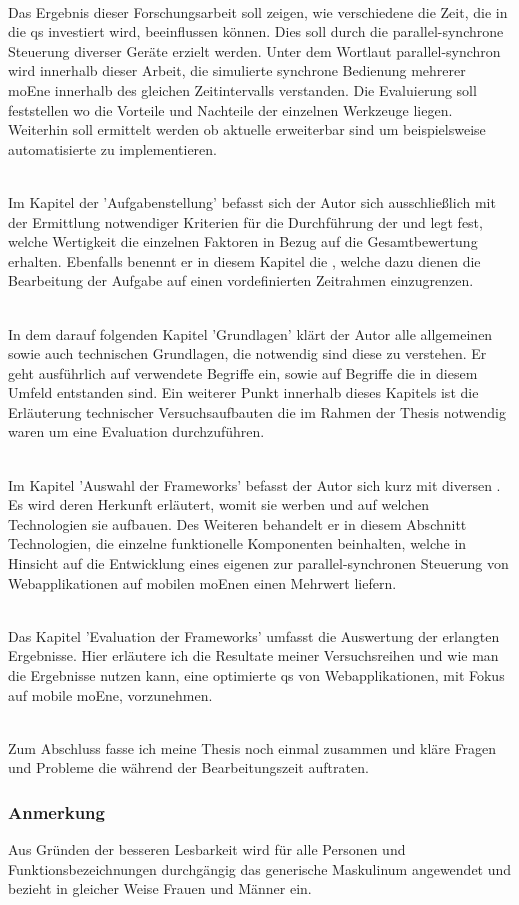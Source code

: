 \\Das Ergebnis dieser Forschungsarbeit soll zeigen, wie verschiedene  die Zeit, die in die \Gls{qs} investiert wird, beeinflussen können. Dies soll durch die \gls{parallel-synchron}e Steuerung diverser Geräte  erzielt werden. Unter dem Wortlaut \gls{parallel-synchron} wird innerhalb dieser Arbeit, die simulierte synchrone Bedienung mehrerer \Gls{moEn}e innerhalb des gleichen Zeitintervalls verstanden. Die Evaluierung soll feststellen wo die Vorteile und Nachteile der einzelnen Werkzeuge liegen. Weiterhin soll ermittelt werden ob aktuelle  erweiterbar sind um beispielsweise automatisierte  zu implementieren. 



\\Im Kapitel der 'Aufgabenstellung' befasst sich der Autor sich ausschließlich mit der Ermittlung notwendiger Kriterien für die Durchführung der  und legt fest, welche Wertigkeit die einzelnen Faktoren in Bezug auf die Gesamtbewertung erhalten. Ebenfalls benennt er in diesem Kapitel die , welche dazu dienen die Bearbeitung der Aufgabe auf einen vordefinierten Zeitrahmen einzugrenzen.

\\In dem darauf folgenden Kapitel 'Grundlagen' klärt der Autor alle allgemeinen sowie auch technischen Grundlagen, die notwendig sind diese  zu verstehen. Er geht ausführlich auf verwendete Begriffe ein, sowie auf Begriffe die in diesem Umfeld entstanden sind. Ein weiterer Punkt innerhalb dieses Kapitels ist die Erläuterung technischer Versuchsaufbauten die im Rahmen der Thesis notwendig waren um eine Evaluation durchzuführen.

\\Im Kapitel 'Auswahl der \Gls{Framework}s' befasst der Autor sich kurz mit diversen . Es wird deren Herkunft erläutert, womit sie werben und auf welchen Technologien sie aufbauen. Des Weiteren behandelt er in diesem Abschnitt Technologien, die einzelne funktionelle Komponenten beinhalten, welche in Hinsicht auf die Entwicklung eines eigenen  zur \gls{parallel-synchron}en Steuerung von Webapplikationen auf mobilen \Gls{moEn}en einen Mehrwert liefern.

\\Das Kapitel 'Evaluation der \Gls{Framework}s' umfasst die Auswertung der erlangten Ergebnisse. Hier erläutere ich die Resultate meiner Versuchsreihen und wie man die Ergebnisse nutzen kann, eine optimierte \Gls{qs} von Webapplikationen, mit Fokus auf mobile \Gls{moEn}e, vorzunehmen.

\\Zum Abschluss fasse ich meine Thesis noch einmal zusammen und kläre Fragen und Probleme die während der Bearbeitungszeit auftraten.

\vfill
\subsubsection{Anmerkung}
Aus Gründen der besseren Lesbarkeit wird für alle Personen und Funktionsbezeichnungen durchgängig das generische Maskulinum angewendet und bezieht in gleicher Weise Frauen und Männer ein.